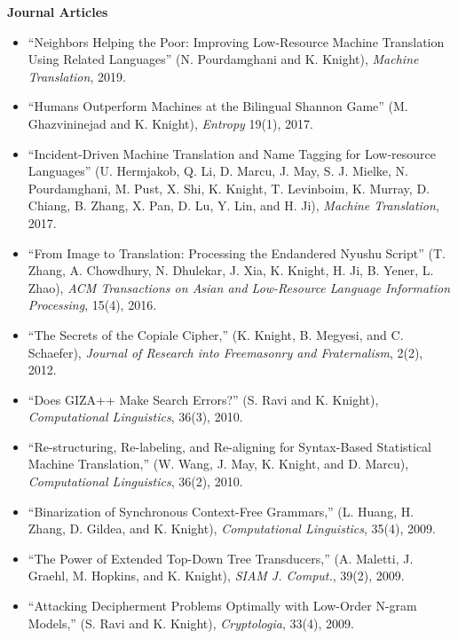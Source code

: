 \noindent
{\bf Journal Articles}
\begin{itemize}
\item ``Neighbors Helping the Poor: Improving Low-Resource Machine Translation Using Related Languages'' (N. Pourdamghani and K. Knight), {\em Machine Translation}, 2019. 

\item ``Humans Outperform Machines at the Bilingual Shannon Game'' (M. Ghazvininejad and K. Knight), {\em Entropy} 19(1), 2017.

\item ``Incident-Driven Machine Translation and Name Tagging for Low-resource Languages'' (U. Hermjakob, Q. Li, D. Marcu, J. May, S. J. Mielke, N. Pourdamghani, M. Pust, X. Shi, K. Knight, T. Levinboim, K. Murray, D. Chiang, B. Zhang, X. Pan, D. Lu, Y. Lin, and H. Ji), {\em Machine Translation}, 2017.

\item ``From Image to Translation: Processing the Endandered Nyushu Script'' (T. Zhang, A. Chowdhury, N. Dhulekar, J. Xia, K. Knight, H. Ji, B. Yener, L. Zhao), {\em ACM Transactions on Asian and Low-Resource Language Information Processing}, 15(4), 2016. 

\item ``The Secrets of the Copiale Cipher,'' 
(K. Knight, B. Megyesi, and C. Schaefer), 
{\em Journal of Research into Freemasonry and Fraternalism}, 2(2), 2012. 

\item ``Does GIZA++ Make Search Errors?'' (S. Ravi and K. Knight),
{\em Computational Linguistics}, 36(3), 2010.

\item ``Re-structuring, Re-labeling, and Re-aligning for Syntax-Based
Statistical Machine Translation,'' (W. Wang, J. May, K. Knight, 
and D. Marcu), {\em Computational Linguistics}, 36(2), 2010.

\item ``Binarization of Synchronous Context-Free Grammars,'' (L. Huang, 
H. Zhang, D. Gildea, and K. Knight), {\em Computational Linguistics}, 
35(4), 2009.

\item ``The Power of Extended Top-Down Tree Transducers,''
(A. Maletti, J. Graehl, M. Hopkins, and K. Knight),
{\em SIAM J. Comput.}, 39(2), 2009.

\item ``Attacking Decipherment Problems Optimally with Low-Order 
N-gram Models,''
(S. Ravi and K. Knight), {\em Cryptologia}, 33(4), 2009.


\end{itemize}
